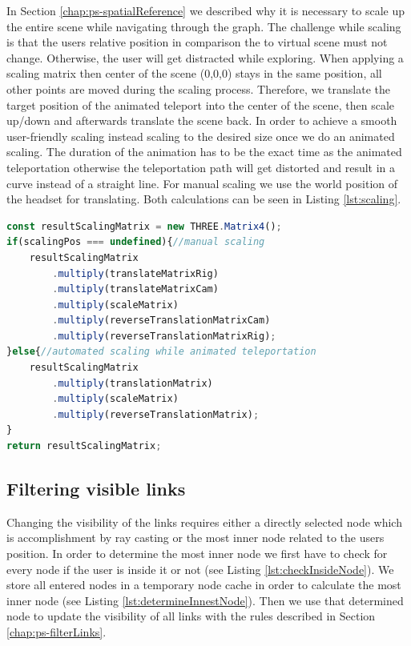 In Section \ref{chap:ps-spatialReference} we described why it is necessary to scale up the entire scene while navigating through the graph. 
The challenge while scaling is that the users relative position in comparison the to virtual scene must not change. Otherwise, the user will get distracted while exploring.
When applying a scaling matrix then center of the scene (0,0,0) stays in the same position, all other points are moved during the scaling process. 
Therefore, we translate the target position of the animated teleport into the center of the scene, then scale up/down and afterwards translate the scene back.
In order to achieve a smooth user-friendly scaling instead scaling to the desired size once we do an animated scaling. The duration of the animation has to be the exact time as the animated teleportation otherwise the teleportation path will get distorted and result in a curve instead of a straight line.
For manual scaling we use the world position of the headset for translating. Both calculations can be seen in Listing \ref{lst:scaling}.

\begin{lstlisting}[language=JavaScript,label={lst:scaling},caption=Simplified algorithm for calculating the scaling matrix]
const resultScalingMatrix = new THREE.Matrix4();
if(scalingPos === undefined){//manual scaling
    resultScalingMatrix
        .multiply(translateMatrixRig)
        .multiply(translateMatrixCam)
        .multiply(scaleMatrix)
        .multiply(reverseTranslationMatrixCam)
        .multiply(reverseTranslationMatrixRig);
}else{//automated scaling while animated teleportation
    resultScalingMatrix
        .multiply(translationMatrix)
        .multiply(scaleMatrix)
        .multiply(reverseTranslationMatrix);
}
return resultScalingMatrix;
\end{lstlisting}

\subsection{Filtering visible links}
\label{sec:linkFiltering}

Changing the visibility of the links requires either a directly selected node which is accomplishment by ray casting or the most inner node related to the users position.
In order to determine the most inner node we first have to check for every node if the user is inside it or not (see Listing \ref{lst:checkInsideNode}). We store all entered nodes in a temporary node cache in order to calculate the most inner node (see Listing \ref{lst:determineInnestNode}).
Then we use that determined node to update the visibility of all links with the rules described in Section \ref{chap:ps-filterLinks}.

